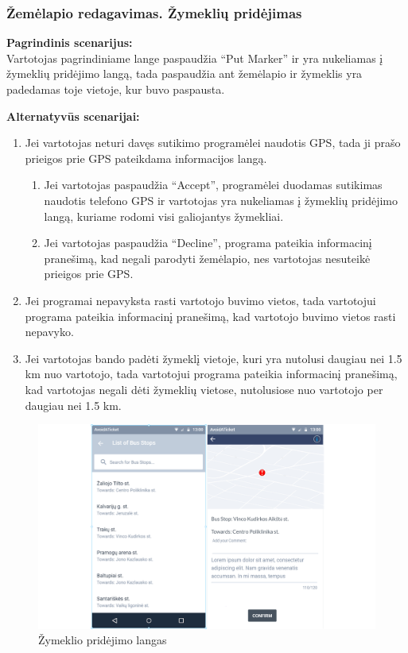 \documentclass{VUMIFPSkursinis}
\begin{document}
\subsubsection{Žemėlapio redagavimas. Žymeklių pridėjimas}
	\textbf{Pagrindinis scenarijus:}\\
	Vartotojas pagrindiniame lange paspaudžia “Put Marker” ir yra nukeliamas į žymeklių pridėjimo langą, tada paspaudžia ant žemėlapio ir žymeklis yra padedamas toje vietoje, kur buvo paspausta.

	\textbf{Alternatyvūs scenarijai:}
	\begin{enumerate}
		\item Jei vartotojas neturi davęs sutikimo programėlei naudotis GPS, tada ji prašo prieigos prie GPS pateikdama informacijos langą.
		\begin{enumerate}
			\item Jei vartotojas paspaudžia “Accept”, programėlei duodamas sutikimas naudotis telefono GPS ir vartotojas yra nukeliamas į žymeklių pridėjimo langą, kuriame rodomi visi galiojantys žymekliai.
			\item Jei vartotojas paspaudžia “Decline”, programa pateikia informacinį pranešimą, kad negali parodyti žemėlapio, nes vartotojas nesuteikė prieigos prie GPS.
		\end{enumerate} 
		\item Jei programai nepavyksta rasti vartotojo buvimo vietos, tada vartotojui programa pateikia informacinį pranešimą, kad vartotojo buvimo vietos rasti nepavyko.
		\item Jei vartotojas bando padėti žymeklį vietoje, kuri yra nutolusi daugiau nei 1.5 km nuo vartotojo, tada vartotojui programa pateikia informacinį pranešimą, kad vartotojas negali dėti žymeklių vietose, nutolusiose nuo vartotojo per daugiau nei 1.5 km.
	\end{enumerate} 
	\begin{figure}[H]
				\centering
				\includegraphics[scale=0.2]{img/mockup_AddMarker}
				\caption{Žymeklio pridėjimo langas}
				\label{img:Žymeklio pridėjimo langas}
			\end{figure}
\end{document}
